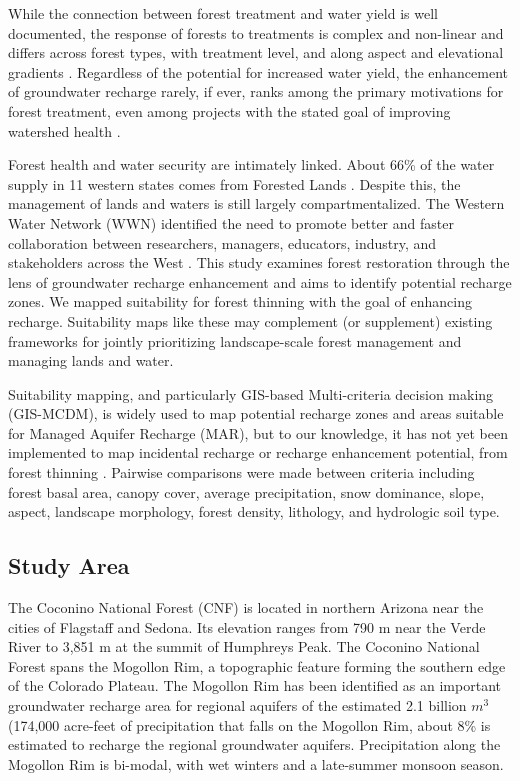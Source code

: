 \documentclass[
  number,
  preprint,
  3p,
  onecolumn]{elsarticle}
\begin{document}
While the connection between forest treatment and water yield is well
documented, the response of forests to treatments is complex and
non-linear and differs across forest types, with treatment level, and
along aspect and elevational gradients
\citep{del_campo_global_2022, biederman_streamflow_2022, zou_streamflow_2010, hibbert1979, moore_physical_2005}.
Regardless of the potential for increased water yield, the enhancement
of groundwater recharge rarely, if ever, ranks among the primary
motivations for forest treatment, even among projects with the stated
goal of improving watershed health
\citep{stanturf2014, filoso2017, allen_ecological_2002, friederici2013, odonnell2016}.

Forest health and water security are intimately linked. About 66\% of
the water supply in 11 western states comes from Forested Lands
\citep{brown_source_2005}. Despite this, the management of lands and
waters is still largely compartmentalized. The Western Water Network
(WWN) identified the need to promote better and faster collaboration
between researchers, managers, educators, industry, and stakeholders
across the West \citep{hansen2024}. This study examines forest
restoration through the lens of groundwater recharge enhancement and
aims to identify potential recharge zones. We mapped suitability for
forest thinning with the goal of enhancing recharge. Suitability maps
like these may complement (or supplement) existing frameworks for
jointly prioritizing landscape-scale forest management and managing
lands and water.

Suitability mapping, and particularly GIS-based Multi-criteria decision
making (GIS-MCDM), is widely used to map potential recharge zones and
areas suitable for Managed Aquifer Recharge (MAR), but to our knowledge,
it has not yet been implemented to map incidental recharge or recharge
enhancement potential, from forest thinning
\citep{fathi2021, rajashekar2023, rahman2012}. Pairwise comparisons were
made between criteria including forest basal area, canopy cover, average
precipitation, snow dominance, slope, aspect, landscape morphology,
forest density, lithology, and hydrologic soil type.

\subsection{Study Area}\label{study-area}

The Coconino National Forest (CNF) is located in northern Arizona near
the cities of Flagstaff and Sedona. Its elevation ranges from 790 m near
the Verde River to 3,851 m at the summit of Humphreys Peak. The Coconino
National Forest spans the Mogollon Rim, a topographic feature forming
the southern edge of the Colorado Plateau. The Mogollon Rim has been
identified as an important groundwater recharge area for regional
aquifers \citep{parker2005} of the estimated 2.1 billion \(m^3\)
(174,000 acre-feet of precipitation that falls on the Mogollon Rim,
about 8\% is estimated to recharge the regional groundwater
aquifers\citep{parker2005}. Precipitation along the Mogollon Rim is
bi-modal, with wet winters and a late-summer monsoon season.
\end{document}
